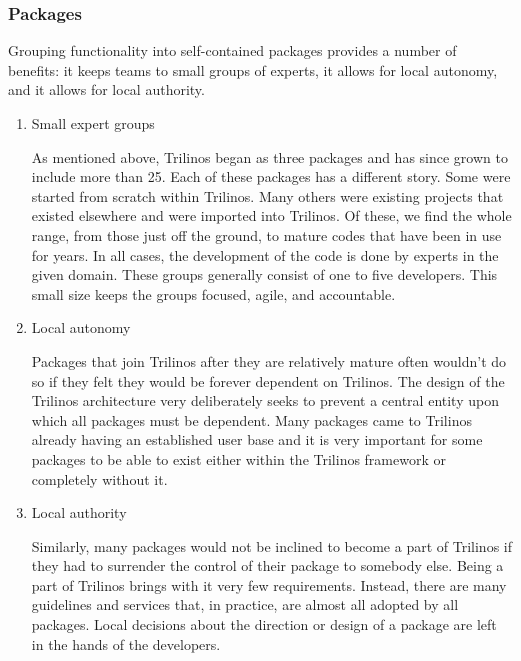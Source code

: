 \documentclass[12pt,relax]{article}
\begin{document}
  \subsubsection{Packages}
  
  Grouping functionality into self-contained packages provides a number of
  benefits:  it keeps teams to small groups of experts, it allows for local
  autonomy, and it allows for local authority.
  
  \begin{enumerate}
  \item  Small expert groups
  
  As mentioned above, Trilinos began as three packages and has since grown to 
  include more than 25.  Each of these packages has a different story.  Some
  were started from scratch within Trilinos.  Many others were existing
  projects that existed elsewhere and were imported into Trilinos.  Of these,
  we find the whole range, from those just off the ground, to mature codes
  that have been in use for years.  In all cases, the development of the 
  code is done by experts in the given domain.  These groups generally consist
  of one to five developers.  This small size keeps the groups
  focused, agile, and accountable.
  
  \item Local autonomy
    
  Packages that join Trilinos after they are relatively mature often wouldn't
  do so if they felt they would be forever dependent on Trilinos.  The design
  of the Trilinos architecture very deliberately seeks to prevent a central
  entity upon which all packages must be dependent.  Many packages came to 
  Trilinos already having an established user base and it is very important
  for some packages to be able to exist either within the Trilinos framework
  or completely without it.
  
  \item Local authority
  
  Similarly, many packages would not be inclined to become a part of Trilinos
  if they had to surrender the control of their package to somebody else.
  Being a part of Trilinos brings with it very few requirements.  Instead,
  there are many guidelines and services that, in practice, are almost all
  adopted by all packages.  Local decisions about the direction or design of
  a package are left in the hands of the developers.

  \end{enumerate}
\end{document}
